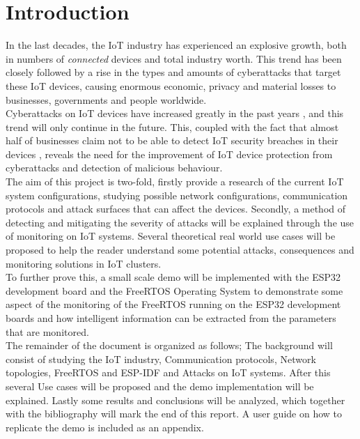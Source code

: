 \chapter{Introduction}

In the last decades, the IoT industry has experienced an explosive growth, both in numbers of \textit{connected} devices and total industry worth. This trend has been closely followed by a rise in the types and amounts of cyberattacks that target these IoT devices, causing enormous economic, privacy and material losses to businesses, governments and people worldwide.\\

Cyberattacks on IoT devices have increased greatly in the past years \cite{forbes}, and this trend will only continue in the future. This, coupled with the fact that almost half of businesses claim not to be able to detect IoT security breaches in their devices \cite{gemalto}, reveals the need for the improvement of IoT device protection from cyberattacks and detection of malicious behaviour.\\

The aim of this project is two-fold, firstly provide a research of the current IoT system configurations, studying possible network configurations, communication protocols and attack surfaces that can affect the devices. Secondly, a method of detecting and mitigating the severity of attacks will be explained through the use of monitoring on IoT systems. Several theoretical real world use cases will be proposed to help the reader understand some potential attacks, consequences and monitoring solutions in IoT clusters.\\

To further prove this, a small scale demo will be implemented with the ESP32 development board and the FreeRTOS Operating System to demonstrate some aspect of the monitoring of the FreeRTOS running on the ESP32 development boards and how intelligent information can be extracted from the parameters that are monitored.\\

The remainder of the document is organized as follows; The background will consist of studying the IoT industry, Communication protocols, Network topologies, FreeRTOS  and ESP-IDF and Attacks on IoT systems. After this several Use cases will be proposed and the demo implementation will be explained. Lastly some results and conclusions will be analyzed, which together with the bibliography will mark the end of this report. A user guide on how to replicate the demo is included as an appendix. 





